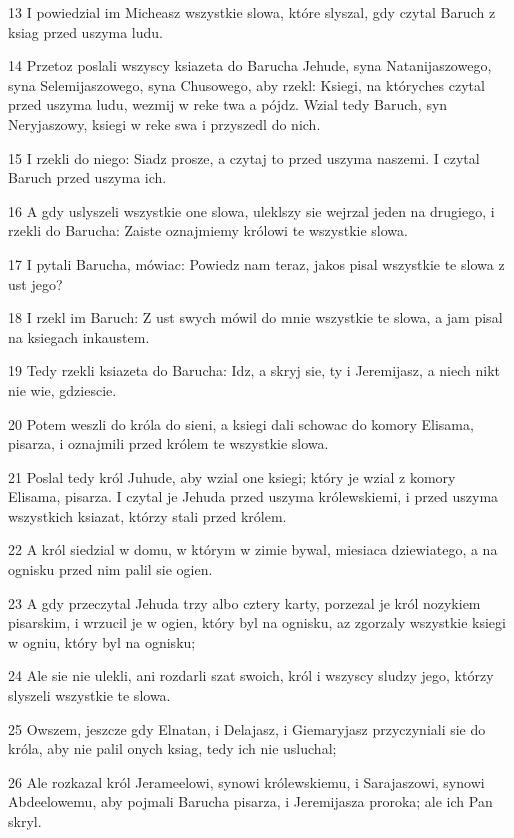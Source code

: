 \par 13 I powiedzial im Micheasz wszystkie slowa, które slyszal, gdy czytal Baruch z ksiag przed uszyma ludu.
\par 14 Przetoz poslali wszyscy ksiazeta do Barucha Jehude, syna Natanijaszowego, syna Selemijaszowego, syna Chusowego, aby rzekl: Ksiegi, na któryches czytal przed uszyma ludu, wezmij w reke twa a pójdz. Wzial tedy Baruch, syn Neryjaszowy, ksiegi w reke swa i przyszedl do nich.
\par 15 I rzekli do niego: Siadz prosze, a czytaj to przed uszyma naszemi. I czytal Baruch przed uszyma ich.
\par 16 A gdy uslyszeli wszystkie one slowa, uleklszy sie wejrzal jeden na drugiego, i rzekli do Barucha: Zaiste oznajmiemy królowi te wszystkie slowa.
\par 17 I pytali Barucha, mówiac: Powiedz nam teraz, jakos pisal wszystkie te slowa z ust jego?
\par 18 I rzekl im Baruch: Z ust swych mówil do mnie wszystkie te slowa, a jam pisal na ksiegach inkaustem.
\par 19 Tedy rzekli ksiazeta do Barucha: Idz, a skryj sie, ty i Jeremijasz, a niech nikt nie wie, gdziescie.
\par 20 Potem weszli do króla do sieni, a ksiegi dali schowac do komory Elisama, pisarza, i oznajmili przed królem te wszystkie slowa.
\par 21 Poslal tedy król Juhude, aby wzial one ksiegi; który je wzial z komory Elisama, pisarza. I czytal je Jehuda przed uszyma królewskiemi, i przed uszyma wszystkich ksiazat, którzy stali przed królem.
\par 22 A król siedzial w domu, w którym w zimie bywal, miesiaca dziewiatego, a na ognisku przed nim palil sie ogien.
\par 23 A gdy przeczytal Jehuda trzy albo cztery karty, porzezal je król nozykiem pisarskim, i wrzucil je w ogien, który byl na ognisku, az zgorzaly wszystkie ksiegi w ogniu, który byl na ognisku;
\par 24 Ale sie nie ulekli, ani rozdarli szat swoich, król i wszyscy sludzy jego, którzy slyszeli wszystkie te slowa.
\par 25 Owszem, jeszcze gdy Elnatan, i Delajasz, i Giemaryjasz przyczyniali sie do króla, aby nie palil onych ksiag, tedy ich nie usluchal;
\par 26 Ale rozkazal król Jerameelowi, synowi królewskiemu, i Sarajaszowi, synowi Abdeelowemu, aby pojmali Barucha pisarza, i Jeremijasza proroka; ale ich Pan skryl.
